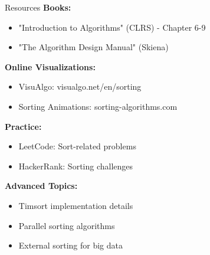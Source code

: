 \documentclass[aspectratio=169]{beamer}
\begin{document}
\begin{frame}{Resources}
  \textbf{Books:}
  \begin{itemize}
    \item "Introduction to Algorithms" (CLRS) - Chapter 6-9
    \item "The Algorithm Design Manual" (Skiena)
  \end{itemize}

  \vspace{0.3cm}
  \textbf{Online Visualizations:}
  \begin{itemize}
    \item VisuAlgo: visualgo.net/en/sorting
    \item Sorting Animations: sorting-algorithms.com
  \end{itemize}

  \vspace{0.3cm}
  \textbf{Practice:}
  \begin{itemize}
    \item LeetCode: Sort-related problems
    \item HackerRank: Sorting challenges
  \end{itemize}

  \vspace{0.3cm}
  \textbf{Advanced Topics:}
  \begin{itemize}
    \item Timsort implementation details
    \item Parallel sorting algorithms
    \item External sorting for big data
  \end{itemize}
\end{frame}
\end{document}
